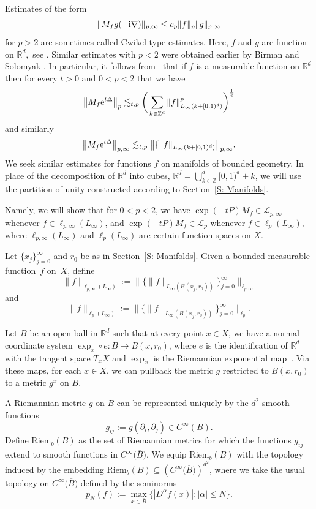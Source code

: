 \documentclass[pdftex]{sigma}
\numberwithin{equation}{section}
\begin{document}
Estimates of the form
\[
 \|M_fg(-{\rm i}\nabla)\|_{p,\infty} \leq c_p\|f\|_p\|g\|_{p,\infty}
\]
for $p>2$ are sometimes called Cwikel-type estimates. Here, $f$ and $g$ are function on $\mathbb{R}^d,$
see \cite[Chapter 4]{Simon2005}. Similar estimates with $p<2$ were obtained earlier by Birman and Solomyak \cite{BirmanSolomyak1969}.
In particular, it follows from~\cite[Theorem~4.5]{Simon2005} that if $f$ is a measurable function on $\mathbb{R}^d$ then for every $t>0$ and $0<p<2$ that we have
\[
 \big\|M_f{\rm e}^{t\Delta}\big\|_{p} \lesssim_{t,p} \bigg(\sum_{k\in \mathbb{Z}^d} \|f\|_{L_\infty(k+[0,1)^d)}^p\bigg)^{\frac1p}
\]
and similarly
\[
 \big\|M_f{\rm e}^{t\Delta}\big\|_{p,\infty} \lesssim_{t,p} \big\|\{\|f\|_{L_{\infty}(k+[0,1)^d)}\big\|_{p,\infty}.
\]
We seek similar estimates for functions $f$ on manifolds of bounded geometry. In place of the decomposition of $\mathbb{R}^d$ into cubes, $\mathbb{R}^d = \bigcup_{k\in \mathbb{Z}}^d [0,1)^d+k$, we will use the partition of unity constructed according to Section~\ref{S: Manifolds}.

Namely, we will show that for $0<p<2$, we have $\exp(-tP)M_f \in \mathcal{L}_{p,\infty}$ whenever $f\in \ell_{p,\infty}(L_\infty)$, and $\exp(-tP)M_f \in \mathcal{L}_{p}$ whenever $f\in \ell_{p}(L_\infty),$
where $\ell_{p,\infty}(L_\infty)$ and $\ell_p(L_{\infty})$ are certain function spaces on $X.$

\begin{Definition}
 Let $\{x_j\}_{j=0}^\infty$ and $r_0$ be as in Section~\ref{S: Manifolds}. Given a bounded measurable function~$f$ on~$X$, define
 \[
 \|f\|_{\ell_{p,\infty}(L_\infty)} := \big\| \{\|f\|_{L_{\infty}(B(x_j,r_0))}\}_{j=0}^\infty\big\|_{\ell_{p,\infty}}
 \]
 and
 \[
 \|f\|_{\ell_{p}(L_\infty)} := \big\| \{\|f\|_{L_{\infty}(B(x_j,r_0))}\}_{j=0}^\infty\big\|_{\ell_{p}}.
 \]
\end{Definition}

Let $B$ be an open ball in $\mathbb{R}^d$ such that at every point $x\in X$, we have a normal coordinate system $\exp_x \circ e\colon B \to B(x, r_0)$, where $e$ is the identification of $\mathbb{R}^d$ with the tangent space $T_xX$ and $\exp_x$ is the Riemannian exponential map~\cite[Proposition~1.2]{Kordyukov1991}. Via these maps, for each $x\in X$, we can pullback the metric $g$ restricted to $B(x, r_0)$ to a metric $g^x$ on $B$.

\begin{Definition}%
A Riemannian metric $g$ on $B$ can be represented uniquely by the $d^2$ smooth functions
\[
g_{ij}:= g(\partial_i, \partial_j) \in C^\infty(B).
\]
Define $\mathrm{Riem}_b(B)$ as the set of Riemannian metrics for which the functions $g_{ij}$ extend to smooth functions in $C^\infty\bigl(\overline{B}\bigr)$. We equip $\mathrm{Riem}_b(B)$ with the topology induced by the embedding $\mathrm{Riem}_b(B)\allowbreak \subseteq (C^\infty\bigl(\overline{B}\bigr))^{d^2}$, where we take the usual topology on $C^\infty\bigl(\overline{B}\bigr)$ defined by the seminorms
\[
p_N(f) := \max_{x\in \overline{B}} \{|D^\alpha f(x)|\colon |\alpha|\leq N \}.
\]
\end{Definition}
\end{document}
